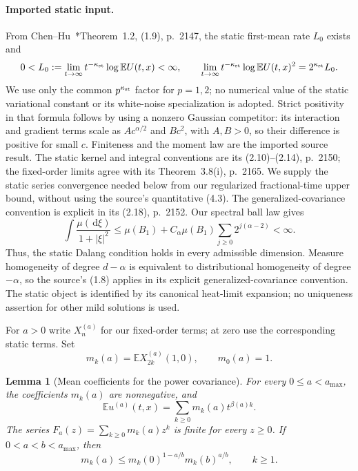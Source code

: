 \documentclass[12pt,oneside,openany]{book}
\numberwithin{equation}{section}
\newtheorem{lemma}[theorem]{Lemma}
\theoremstyle{nogostyle}
\theoremstyle{definition}
\newcommand{\E}{\mathbb{E}}
\newcommand{\ud}{\,\mathrm{d}}
\begin{document}
\paragraph{Imported static input.}
From Chen--Hu~\cite{chen.hu:25:hyperbolic}*{Theorem~1.2, (1.9), p.~2147}, the
static first-mean rate $L_0$ exists and
\begin{equation}\label{E:static-ratio-input}
  0<L_0:=\lim_{t\to\infty}t^{-\kappa_{\rm st}}\log\E U(t,x)<\infty,
  \qquad
  \lim_{t\to\infty}t^{-\kappa_{\rm st}}\log\E U(t,x)^2
  =2^{\kappa_{\rm st}}L_0.
\end{equation}
We use only the common $p^{\kappa_{\rm st}}$ factor for $p = 1,2$; no numerical
value of the static variational constant or its white-noise specialization is
adopted. Strict positivity in that formula follows by using a nonzero Gaussian
competitor: its interaction and gradient terms scale as $A c^{\alpha/2}$ and $B
c^2$, with $A,B > 0$, so their difference is positive for small $c$. Finiteness
and the moment law are the imported source result. The static kernel and
integral conventions are its (2.10)--(2.14), p.~2150; the fixed-order limits
agree with its Theorem~3.8(i), p.~2165. We supply the static series convergence
needed below from our regularized fractional-time upper bound, without using the
source's quantitative (4.3). The generalized-covariance convention is explicit
in its (2.18), p.~2152. Our spectral ball law gives
\[
  \int\frac{\mu(\ud\xi)}{1+|\xi|^2}
  \le\mu(B_1)+C_\alpha\mu(B_1)\sum_{j\ge0}2^{j(\alpha-2)}<\infty.
\]
Thus, the static Dalang condition holds in every admissible dimension. Measure
homogeneity of degree $d-\alpha$ is equivalent to distributional homogeneity of
degree $-\alpha$, so the source's (1.8) applies in its explicit
generalized-covariance convention. The static object is identified by its
canonical heat-limit expansion; no uniqueness assertion for other mild solutions
is used.

For $a > 0$ write $X_n^{(a)}$ for our fixed-order terms; at zero use the
corresponding static terms. Set
\[
  m_k(a)=\E X_{2k}^{(a)}(1,0),\qquad m_0(a)=1.
\]

\begin{lemma}[Mean coefficients for the power covariance]\label{L:mean-coefficient-holder}
  For every $0 \le a < a_{\max}$, the coefficients $m_k(a)$ are nonnegative, and
  \begin{equation}\label{E:mean-positive-series}
    \E u^{(a)}(t,x)=\sum_{k\ge0}m_k(a)t^{\beta(a)k}.
  \end{equation}
  The series $F_a(z) = \sum_{k\ge0}m_k(a)z^k$ is finite for every $z \ge 0$. If
  $0 < a < b < a_{\max}$, then
  \begin{equation}\label{E:mean-coefficient-holder}
    m_k(a)\le m_k(0)^{1-a/b}m_k(b)^{a/b},\qquad k\ge1.
  \end{equation}
\end{lemma}
\end{document}
